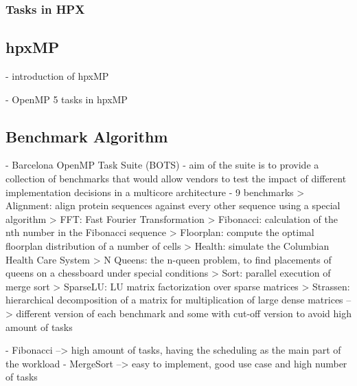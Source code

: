 \subsubsection{Tasks in HPX}


\subsection{hpxMP}
\cite{TianyiZhang.2019}
- introduction of hpxMP

\cite{Zhang.2192020}
- OpenMP 5 tasks in hpxMP


    
\subsection{Benchmark Algorithm}
- Barcelona OpenMP Task Suite (BOTS)
	- aim of the suite is to provide a collection of benchmarks that would allow vendors to test the impact of different implementation decisions in a multicore architecture
	- 9 benchmarks
		> Alignment: align protein sequences against every other sequence using a special algorithm
		> FFT: Fast Fourier Transformation
		> Fibonacci: calculation of the nth number in the Fibonacci sequence
		> Floorplan: compute the optimal floorplan distribution of a number of cells
		> Health: simulate the Columbian Health Care System
		> N Queens: the n-queen problem, to find placements of queens on a chessboard under special conditions
		> Sort: parallel execution of merge sort
		> SparseLU: LU matrix factorization over sparse matrices
		> Strassen: hierarchical decomposition of a matrix for multiplication of large dense matrices
	--> different version of each benchmark and some with cut-off version to avoid high amount of tasks
	

	- Fibonacci --> high amount of tasks, having the scheduling as the main part of the workload
	- MergeSort --> easy to implement, good use case and high number of tasks
	
